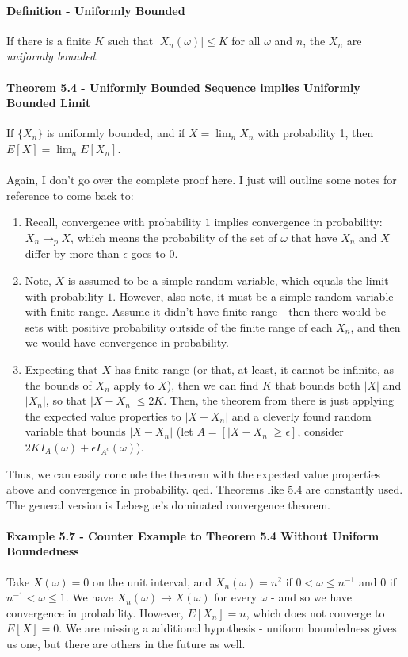 \documentclass[12pt,a4paper]{article}
\newcommand{\1}[1]{\mathbbm{1}\left\{ #1 \right\}}
\begin{document}
\paragraph{Definition - Uniformly Bounded} If there is a finite $K$ such that $|X_n(\omega)| \leq K$ for all $\omega$ and $n$, the $X_n$ are \textit{uniformly bounded}.

\paragraph{Theorem 5.4 - Uniformly Bounded Sequence implies Uniformly Bounded Limit} If $\{X_n\}$ is uniformly bounded, and if $X = \lim_n X_n$ with probability 1, then $E[X] = \lim_n E[X_n]$.
\\\\
Again, I don't go over the complete proof here. I just will outline some notes for reference to come back to:
\begin{enumerate}
	\item Recall, convergence with probability $1$ implies convergence in probability: $X_n \to_p X$, which means the probability of the set of $\omega$ that have $X_n$ and $X$ differ by more than $\epsilon$ goes to $0$.
	
	\item Note, $X$ is assumed to be a simple random variable, which equals the limit with probability $1$. However, also note, it must be a simple random variable with finite range. Assume it didn't have finite range - then there would be sets with positive probability outside of the finite range of each $X_n$, and then we would have convergence in probability.
	
	\item Expecting that $X$ has finite range (or that, at least, it cannot be infinite, as the bounds of $X_n$ apply to $X$), then we can find $K$ that bounds both $|X|$ and $|X_n|$, so that $|X - X_n| \leq 2K$. Then, the theorem from there is just applying the expected value properties to $|X - X_n|$ and a cleverly found random variable that bounds $|X - X_n|$ (let $A = [|X - X_n| \geq \epsilon]$, consider $2KI_{A}(\omega) + \epsilon I_{A^c}(\omega)$). 
\end{enumerate}
Thus, we can easily conclude the theorem with the expected value properties above and convergence in probability. qed. Theorems like 5.4 are constantly used. The general version is Lebesgue's dominated convergence theorem.

\paragraph{Example 5.7 - Counter Example to Theorem 5.4 Without Uniform Boundedness} Take $X(\omega) = 0$ on the unit interval, and $X_n(\omega) = n^2$ if $0 < \omega \leq n^{-1}$ and $0$ if $n^{-1} < \omega \leq 1$. We have $X_n(\omega) \to X(\omega)$ for every $\omega$ - and so we have convergence in probability. However, $E[X_n] = n$, which does not converge to $E[X] = 0$. We are missing a additional hypothesis - uniform boundedness gives us one, but there are others in the future as well.
\end{document}
